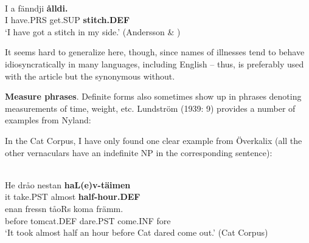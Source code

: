 \ea \label{} 
\\
\gll I  a  fänndji  \textbf{ålldi.} \\
I  have.PRS  get.SUP  \textbf{stitch.DEF} \\
\glt ‘I have got a stitch in my side.’ (Andersson \& \citet[285]{Danielsson1999})

\z

It seems hard to generalize here, though, since names of illnesses tend to behave idiosyncratically in many languages, including English – thus,  is preferably used with the article but the synonymous  without.


\textbf{Measure phrases}. Definite forms also sometimes show up in phrases denoting measurements of time, weight, etc. Lundström (1939: 9) provides a number of examples from Nyland: 


\ea
	
	\z
\z 
	
In the Cat Corpus, I have only found one clear example from Överkalix (all the other vernaculars have an indefinite NP in the corresponding sentence):


\ea \label{} 
\\
\gll He  dråo  nestan  \textbf{haL(e)v-täimen}\\
it  take.PST  almost  \textbf{half-hour.DEF}\\
\gll enan  fressn  tåoRs  koma  främm.\\
before  tomcat.DEF  dare.PST  come.INF  fore\\
\glt ‘It took almost half an hour before Cat dared come out.’ (Cat Corpus)

